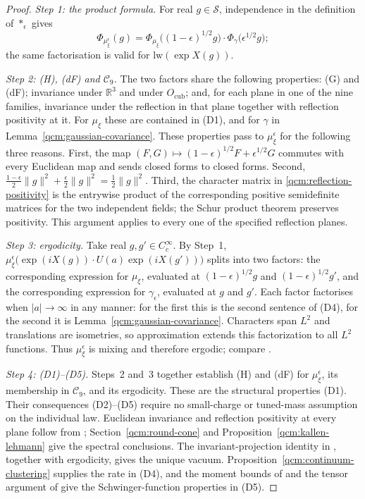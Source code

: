 \documentclass[11pt,letterpaper,reqno]{amsart}
\theoremstyle{definition}
\begin{document}
\begin{proof}
\emph{Step 1: the product formula.}
For real $g\in\mathcal S$, independence in the definition of $\ast_\epsilon$ gives
\begin{equation*}
\Phi_{\mu_\xi^\epsilon}(g)=\Phi_{\mu_\xi}\bigl((1-\epsilon)^{1/2}g\bigr)\cdot\Phi_\gamma\bigl(\epsilon^{1/2}g\bigr);
\end{equation*}
the same factorisation is valid for $\mathrm{lw}(\exp X(g))$.

\emph{Step 2: (H), (dF) and $\mathcal C_9$.}
The two factors share the following properties: (G) and (dF); invariance under $\mathbb R^3$ and under $O_{\mathrm{cub}}$; and, for each plane in one of the nine families, invariance under the reflection in that plane together with reflection positivity at it.
For $\mu_\xi$ these are contained in (D1), and for $\gamma$ in Lemma~\ref{qcm:gaussian-covariance}.
These properties pass to $\mu_\xi^\epsilon$ for the following three reasons.
First, the map $(F,G)\mapsto(1-\epsilon)^{1/2}F+\epsilon^{1/2}G$ commutes with every Euclidean map and sends closed forms to closed forms.
Second, $\frac{1-\epsilon}2\|g\|^2+\frac\epsilon2\|g\|^2=\frac12\|g\|^2$.
Third, the character matrix in \eqref{qcm:reflection-positivity} is the entrywise product of the corresponding positive semidefinite matrices for the two independent fields; the Schur product theorem preserves positivity.
This argument applies to every one of the specified reflection planes.

\emph{Step 3: ergodicity.}
Take real $g,g'\in C_c^\infty$.
By Step~1, $\mu_\xi^\epsilon\bigl(\exp(iX(g))\cdot U(a)\exp(iX(g'))\bigr)$ splits into two factors: the corresponding expression for $\mu_\xi$, evaluated at $(1-\epsilon)^{1/2}g$ and $(1-\epsilon)^{1/2}g'$, and the corresponding expression for $\gamma_\epsilon$, evaluated at $g$ and $g'$.
Each factor factorises when $|a|\to\infty$ in any manner: for the first this is the second sentence of (D4), for the second it is Lemma~\ref{qcm:gaussian-covariance}.
Characters span $L^2$ and translations are isometries, so approximation extends this factorization to all $L^2$ functions. Thus $\mu_\xi^\epsilon$ is mixing and therefore ergodic; compare \cite[Section~7.4]{QEDConstruction}.

\emph{Step 4: (D1)--(D5).}
Steps~2 and~3 together establish (H) and (dF) for $\mu_\xi^\epsilon$, its membership in $\mathcal C_9$, and its ergodicity.
These are the structural properties (D1). Their consequences (D2)--(D5) require no small-charge or tuned-mass assumption on the individual law.
Euclidean invariance and reflection positivity at every plane follow from \cite[Theorem~8.6]{QEDConstruction}; Section~\ref{qcm:round-cone} and Proposition~\ref{qcm:kallen-lehmann} give the spectral conclusions. The invariant-projection identity in \cite[Section~7.3]{QEDConstruction}, together with ergodicity, gives the unique vacuum. Proposition~\ref{qcm:continuum-clustering} supplies the rate in (D4), and the moment bounds of \cite[Section~5]{QEDConstruction} and the tensor argument of \cite[Section~27]{QEDConstruction} give the Schwinger-function properties in (D5).


\end{proof}
\end{document}
